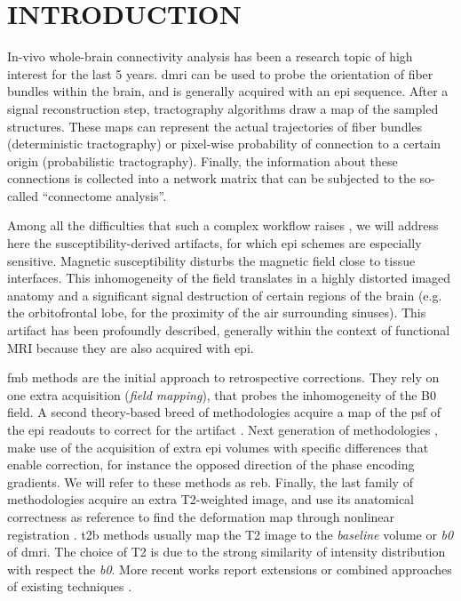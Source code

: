\section{INTRODUCTION}
\label{sec:intro}
In-vivo whole-brain connectivity analysis has been a
research topic of high interest for the last
5 years. 
\Gls*{dmri} can be used to probe the
orientation of fiber bundles within the brain,
and is generally acquired with an \gls*{epi} sequence.
After a signal reconstruction step, 
tractography algorithms draw a map of the sampled 
structures.
These maps can represent the actual trajectories
of fiber bundles (deterministic tractography) or
pixel-wise probability of connection to a certain origin
(probabilistic tractography). Finally, the
information about these connections is collected
into a network matrix that can be subjected to
the so-called ``connectome analysis''.

Among all the difficulties that such a complex workflow
raises \cite{jones_twenty-five_2010}, we will
address here the susceptibility-derived artifacts,
for which \Gls*{epi} schemes are especially sensitive.
Magnetic susceptibility disturbs the magnetic field 
close to tissue interfaces. This inhomogeneity 
of the field translates in a highly distorted imaged 
anatomy and a significant signal destruction of 
certain regions of the brain 
(e.g. the orbitofrontal lobe, for the proximity of the
air surrounding sinuses). This artifact has been
profoundly described, generally within the context of
functional MRI because they are also acquired with 
\gls*{epi}. 

\Gls*{fmb} methods \cite{jezzard_correction_1995} are
the initial approach to retrospective corrections. 
They rely on one extra acquisition (\emph{field mapping}),
that probes the inhomogeneity of the B0 field.
A second theory-based breed of methodologies acquire a 
map of the \acrlong*{psf} of the \gls*{epi} readouts to correct 
for the artifact \cite{robson_measurement_1997}. 
Next generation of methodologies \cite{cordes_geometric_2000,
chiou_simple_2000}, make use of the acquisition of 
extra \gls*{epi} volumes 
with specific differences that enable correction, for instance
the opposed direction of the phase encoding gradients. We will
refer to these methods as \gls*{reb}.
Finally, the last family of methodologies acquire an 
extra T2-weighted image, and use its anatomical correctness 
as reference to find the deformation map through nonlinear 
registration \cite{kybic_unwarping_2000,studholme_accurate_2000}.
\gls*{t2b} methods usually map
the T2 image to the \emph{baseline} volume or \textit{b0}
of \gls*{dmri}. The choice of T2 is due to the strong
similarity of intensity distribution with respect the \textit{b0}.
More recent works report extensions or combined
approaches of existing techniques
\cite{andersson_how_2003,zaitsev_point_2004,%
holland_efficient_2010,andersson_comprehensive_2012}.


